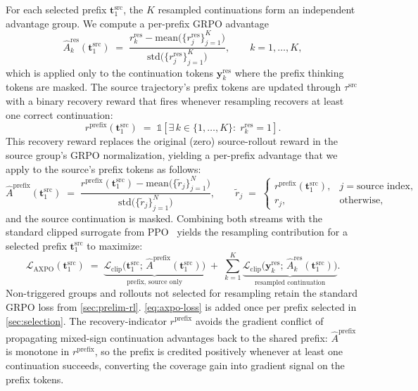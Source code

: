 \documentclass{llmxive}
\providecommand{\bm}[1]{\boldsymbol{#1}}
\providecommand{\vt}{{\bm{t}}}
\providecommand{\vy}{{\bm{y}}}
\begin{document}
For each selected prefix $\vt_1^{\text{src}}$, the $K$ resampled continuations form an independent advantage group. We compute a per-prefix GRPO advantage
\begin{equation}
\label{eq:axpo-adv}
\hat{A}_k^{\text{res}}(\vt_1^{\text{src}}) \;=\; \frac{r_k^{\text{res}} - \mathrm{mean}\bigl(\{r_j^{\text{res}}\}_{j=1}^K\bigr)}{\mathrm{std}\bigl(\{r_j^{\text{res}}\}_{j=1}^K\bigr)}, \qquad k = 1, \ldots, K,
\end{equation}
which is applied only to the continuation tokens $\vy_k^{\text{res}}$ where the prefix thinking tokens are masked. The source trajectory's prefix tokens are updated through $\tau^{\text{src}}$ with a binary recovery reward that fires whenever resampling recovers at least one correct continuation:
\begin{equation}
\label{eq:axpo-recovery}
r^{\text{prefix}}(\vt_1^{\text{src}}) \;=\; \mathds{1}\!\left[\exists\, k \in \{1,\ldots,K\}:\; r_k^{\text{res}} = 1\right].
\end{equation}
This recovery reward replaces the original (zero) source-rollout reward in the source group's GRPO normalization, yielding a per-prefix advantage that we apply to the source's prefix tokens as follows:
\begin{equation}
\label{eq:axpo-prefix-adv}
\hat{A}^{\text{prefix}}(\vt_1^{\text{src}}) \;=\; \frac{r^{\text{prefix}}(\vt_1^{\text{src}}) - \mathrm{mean}\bigl(\{\tilde r_j\}_{j=1}^N\bigr)}{\mathrm{std}\bigl(\{\tilde r_j\}_{j=1}^N\bigr)},
\qquad
\tilde r_j \;=\; \begin{cases} r^{\text{prefix}}(\vt_1^{\text{src}}), & j = \text{source index}, \\ r_j, & \text{otherwise}, \end{cases}
\end{equation}
and the source continuation is masked. Combining both streams with the standard clipped surrogate from PPO~\citep{PPO} yields the resampling contribution for a selected prefix $\vt_1^{\text{src}}$ to maximize:
\begin{equation}
\label{eq:axpo-loss}
\mathcal{L}_{\text{AXPO}}(\vt_1^{\text{src}}) \;=\; \underbrace{\mathcal{L}_{\text{clip}}\bigl(\vt_1^{\text{src}};\, \hat{A}^{\text{prefix}}(\vt_1^{\text{src}})\bigr)}_{\text{prefix, source only}} \;+\; \sum_{k=1}^{K}\underbrace{\mathcal{L}_{\text{clip}}\bigl(\vy_k^{\text{res}};\, \hat{A}_k^{\text{res}}(\vt_1^{\text{src}})\bigr)}_{\text{resampled continuation}}.
\end{equation}
Non-triggered groups and rollouts not selected for resampling retain the standard GRPO loss from \autoref{sec:prelim-rl}.
\autoref{eq:axpo-loss} is added once per prefix selected in \autoref{sec:selection}.
The recovery-indicator $r^{\text{prefix}}$ avoids the gradient conflict of propagating mixed-sign continuation advantages back to the shared prefix: $\hat{A}^{\text{prefix}}$ is monotone in $r^{\text{prefix}}$, so the prefix is credited positively whenever at least one continuation succeeds, converting the coverage gain into gradient signal on the prefix tokens.
\end{document}
